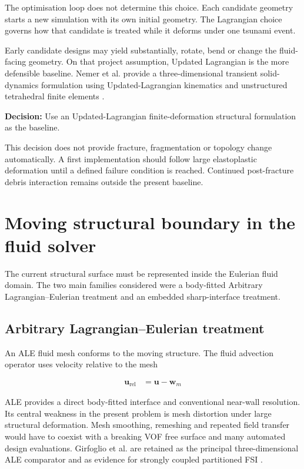 \documentclass[11pt,a4paper]{article}
\newcommand{\decision}[1]{\textbf{Decision:} #1}
\begin{document}
The optimisation loop does not determine this choice. Each candidate geometry starts a new simulation with its own initial geometry. The Lagrangian choice governs how that candidate is treated while it deforms under one tsunami event.

Early candidate designs may yield substantially, rotate, bend or change the fluid-facing geometry. On that project assumption, Updated Lagrangian is the more defensible baseline. Nemer et al. provide a three-dimensional transient solid-dynamics formulation using Updated-Lagrangian kinematics and unstructured tetrahedral finite elements \autocite{nemer2021}.

\decision{Use an Updated-Lagrangian finite-deformation structural formulation as the baseline.}

This decision does not provide fracture, fragmentation or topology change automatically. A first implementation should follow large elastoplastic deformation until a defined failure condition is reached. Continued post-fracture debris interaction remains outside the present baseline.

\section{Moving structural boundary in the fluid solver}
\label{sec:moving-boundary}

The current structural surface must be represented inside the Eulerian fluid domain. The two main families considered were a body-fitted Arbitrary Lagrangian--Eulerian treatment and an embedded sharp-interface treatment.

\subsection{Arbitrary Lagrangian--Eulerian treatment}
\label{subsec:ale}

An ALE fluid mesh conforms to the moving structure. The fluid advection operator uses velocity relative to the mesh

\begin{align}
\bm{u}_{\mathrm{rel}}
&=
\bm{u}-\bm{w}_{m}
\label{eq:ale-relative-velocity}
\end{align}

ALE provides a direct body-fitted interface and conventional near-wall resolution. Its central weakness in the present problem is mesh distortion under large structural deformation. Mesh smoothing, remeshing and repeated field transfer would have to coexist with a breaking VOF free surface and many automated design evaluations. Girfoglio et al. are retained as the principal three-dimensional ALE comparator and as evidence for strongly coupled partitioned FSI \autocite{girfoglio2021}.
\end{document}
